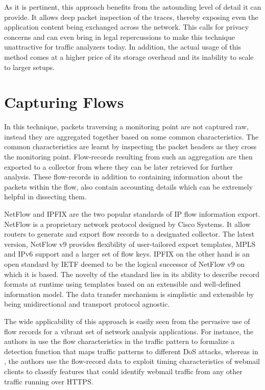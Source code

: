 As it is pertinent, this approach benefits from the astounding level of detail it can provide. It allows deep packet inspection of the traces, thereby exposing even the application content being exchanged  across the network. This calls for privacy concerns and can even bring in legal repercussions to make this technique unattractive for traffic analyzers today. In addition, the actual usage of this method comes at a higher price of its storage overhead and its inability to scale to larger setups.

\section{Capturing Flows}\label{sec:capturing-flows}
In this technique, packets traversing a monitoring point are not captured raw, instead they are aggregated together based on some common characteristics. The common characteristics are learnt by inspecting the packet headers as they cross the monitoring point. Flow-records resulting from such an aggregation are then exported to a collector from where they can be later retrieved for further analysis. These flow-records in addition to containing information about the packets within the flow, also contain accounting details which can be extremely helpful in dissecting them. 

NetFlow and \ac{IPFIX} are the two popular standards of \ac{IP} flow information export. NetFlow \cite{rfc3954} is a proprietary network protocol designed by Cisco Systems. It  allow routers to generate and export flow records to a designated collector. The latest version, NetFlow v$9$ provides flexibility of user-tailored export templates, \ac{MPLS} and \ac{IP}v$6$ support and a larger set of flow keys. \ac{IPFIX} \cite{rfc5101} on the other hand is an open standard by \ac{IETF} deemed to be the logical successor of NetFlow v$9$ on which it is based. The novelty of  the standard lies in its ability to describe record formats at runtime using templates based on an extensible and well-defined information model. The data transfer mechanism is simplistic and extensible by being unidirectional and transport protocol agnostic.  

The wide applicability of this approach is easily seen from the pervasive use of flow records for a vibrant set of network analysis applications. For instance, the authors in \cite{mkim:2004} use the flow characteristics in the traffic pattern to formalize a detection function that maps traffic patterns to different \ac{DoS}  attacks, whereas in \cite{sdominik:2010}, the authors use the flow-record data to exploit timing characteristics of webmail clients to classify features that could identify webmail traffic from any other traffic running over HTTPS.

